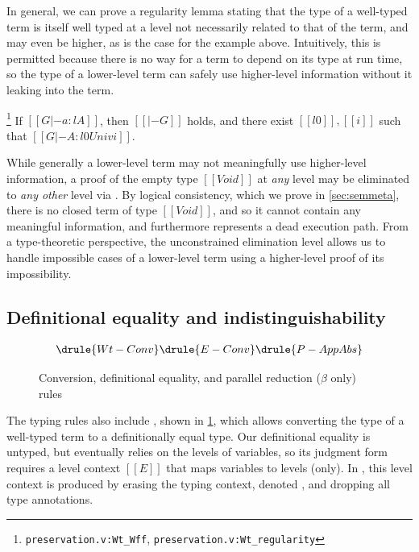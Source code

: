 \documentclass[acmsmall, screen=true, nonacm=true,
  review=\ifpublic false\else true\fi,
  anonymous=\ifanonymous true\else false\fi
]{acmart}
\newcommand{\suppl}[3]{{\scriptsize\texttt{#2:#3}}}
\newcommand{\judgement}[1]{{\setlength{\fboxsep}{1.5pt}\fbox{#1}}}
\newlength{\punctwidth}
\newcommand{\stack}[1]{%
  \settowidth{\punctwidth}{#1}%
  \hspace*{-\the\punctwidth}%
}
\begin{document}
In general, we can prove a regularity lemma stating that the type of a well-typed term
is itself well typed at a level not necessarily related to that of the term,
and may even be higher, as is the case for the example above.
Intuitively, this is permitted because there is no way for a term to depend on its type at run time,
so the type of a lower-level term can safely use higher-level information
without it leaking into the term.

\begin{lemma}[Regularity]
  \stack{.~}\footnote{\suppl{theories}{preservation.v}{Wt\_Wff}, \suppl{theories}{preservation.v}{Wt\_regularity}}
  \label{lem:regularity}
  If $[[G |- a : l A]]$, then $[[|- G]]$ holds,
  and there exist $[[l0]], [[i]]$
  such that $[[G |- A : l0 Univ i]]$.
\end{lemma}

While generally a lower-level term may not meaningfully use higher-level information,
a proof of the empty type $[[Void]]$ at \emph{any} level
may be eliminated to \emph{any other} level via .
By logical consistency, which we prove in \cref{sec:semmeta},
there is no closed term of type $[[Void]]$,
and so it cannot contain any meaningful information,
and furthermore represents a dead execution path.
From a type-theoretic perspective,
the unconstrained elimination level allows us to handle impossible cases of a lower-level term
using a higher-level proof of its impossibility.

\subsection{Definitional equality and indistinguishability} \label{sec:indist}

\begin{figure}[h]
  \begin{gather*}
    \drule{Wt-Conv}
    \drule{E-Conv}
    \drule{P-AppAbs}
  \end{gather*}
  \caption{Conversion, definitional equality, and parallel reduction ($\beta$ only) rules}
  \Description{}
  \label{fig:conv}
\end{figure}

The typing rules also include , shown in \cref{fig:conv},
which allows converting the type of a well-typed term to a definitionally equal type.
Our definitional equality is untyped, but eventually relies on the levels of variables,
so its judgment form \judgement{$[[E |- a == b]]$} requires a level context $[[E]]$ that maps variables to levels (only).
In , this level context is produced by erasing the typing context, 
denoted \judgement{$[[| G |]]$}, and dropping all type annotations.
\end{document}
